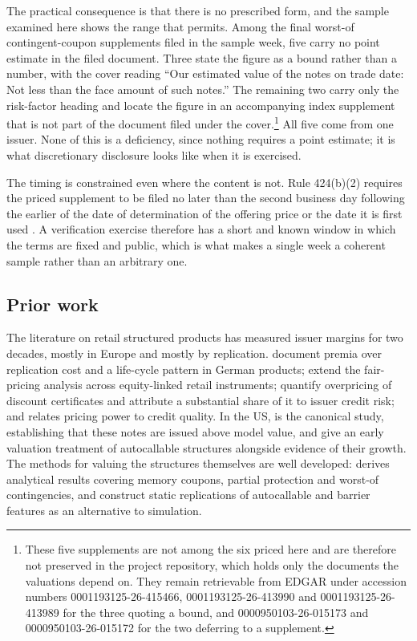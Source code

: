 The practical consequence is that there is no prescribed form, and the sample
examined here shows the range that permits. Among the final worst-of
contingent-coupon supplements filed in the sample week, five carry no point
estimate in the filed document. Three state the figure as a bound rather than a
number, with the cover reading ``Our estimated value of the notes on trade
date: Not less than the face amount of such notes.'' The remaining two carry
only the risk-factor heading and locate the figure in an accompanying index
supplement that is not part of the document filed under the
cover.\footnote{These five supplements are not among the six priced here and
are therefore not preserved in the project repository, which holds only the
documents the valuations depend on. They remain retrievable from EDGAR under
accession numbers 0001193125-26-415466, 0001193125-26-413990 and
0001193125-26-413989 for the three quoting a bound, and 0000950103-26-015173
and 0000950103-26-015172 for the two deferring to a supplement.} All five
come from one issuer. None of this is a deficiency, since nothing requires a
point estimate; it is what discretionary disclosure looks like when it is
exercised.

The timing is constrained even where the content is not. Rule 424(b)(2)
requires the priced supplement to be filed no later than the second business
day following the earlier of the date of determination of the offering price or
the date it is first used \citep{SEC424b2}. A verification exercise therefore
has a short and known window in which the terms are fixed and public, which is
what makes a single week a coherent sample rather than an arbitrary one.

\subsection{Prior work}

The literature on retail structured products has measured issuer margins for
two decades, mostly in Europe and mostly by replication. \citet{Wilkens2003}
document premia over replication cost and a life-cycle pattern in German
products; \citet{Stoimenov2005} extend the fair-pricing analysis across
equity-linked retail instruments; \citet{Entrop2016} quantify overpricing of
discount certificates and attribute a substantial share of it to issuer credit
risk; and \citet{Ruf2011} relates pricing power to credit quality. In the US,
\citet{Henderson2011} is the canonical study, establishing that these notes are
issued above model value, and \citet{Deng2011} give an early valuation
treatment of autocallable structures alongside evidence of their growth. The
methods for valuing the structures themselves are well developed:
\citet{Guillaume2015} derives analytical results covering memory coupons,
partial protection and worst-of contingencies, and \citet{Kim2019} construct
static replications of autocallable and barrier features as an alternative to
simulation.


